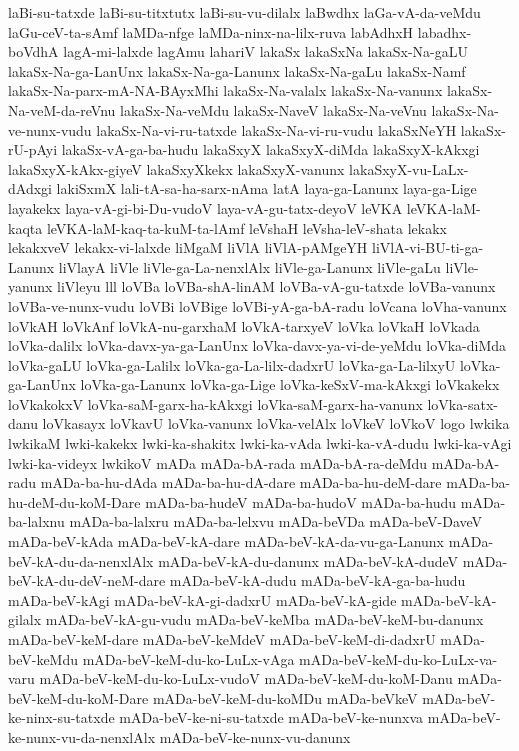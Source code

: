 {laBi-su-tatxde
laBi-su-titxtutx
laBi-su-vu-dilalx
laBwdhx
laGa-vA-da-veMdu
laGu-ceV-ta-sAmf
laMDa-nfge
laMDa-ninx-na-lilx-ruva
labAdhxH
labadhx-boVdhA
lagA-mi-lalxde
lagAmu
lahariV
lakaSx
lakaSxNa
lakaSx-Na-gaLU
lakaSx-Na-ga-LanUnx
lakaSx-Na-ga-Lanunx
lakaSx-Na-gaLu
lakaSx-Namf
lakaSx-Na-parx-mA-NA-BAyxMhi
lakaSx-Na-valalx
lakaSx-Na-vanunx
lakaSx-Na-veM-da-reVnu
lakaSx-Na-veMdu
lakaSx-NaveV
lakaSx-Na-veVnu
lakaSx-Na-ve-nunx-vudu
lakaSx-Na-vi-ru-tatxde
lakaSx-Na-vi-ru-vudu
lakaSxNeYH
lakaSx-rU-pAyi
lakaSx-vA-ga-ba-hudu
lakaSxyX
lakaSxyX-diMda
lakaSxyX-kAkxgi
lakaSxyX-kAkx-giyeV
lakaSxyXkekx
lakaSxyX-vanunx
lakaSxyX-vu-LaLx-dAdxgi
lakiSxmX
lali-tA-sa-ha-sarx-nAma
latA
laya-ga-Lanunx
laya-ga-Lige
layakekx
laya-vA-gi-bi-Du-vudoV
laya-vA-gu-tatx-deyoV
leVKA
leVKA-laM-kaqta
leVKA-laM-kaq-ta-kuM-ta-lAmf
leVshaH
leVsha-leV-shata
lekakx
lekakxveV
lekakx-vi-lalxde
liMgaM
liVlA
liVlA-pAMgeYH
liVlA-vi-BU-ti-ga-Lanunx
liVlayA
liVle
liVle-ga-La-nenxlAlx
liVle-ga-Lanunx
liVle-gaLu
liVle-yanunx
liVleyu
lll
loVBa
loVBa-shA-linAM
loVBa-vA-gu-tatxde
loVBa-vanunx
loVBa-ve-nunx-vudu
loVBi
loVBige
loVBi-yA-ga-bA-radu
loVcana
loVha-vanunx
loVkAH
loVkAnf
loVkA-nu-garxhaM
loVkA-tarxyeV
loVka
loVkaH
loVkada
loVka-dalilx
loVka-davx-ya-ga-LanUnx
loVka-davx-ya-vi-de-yeMdu
loVka-diMda
loVka-gaLU
loVka-ga-Lalilx
loVka-ga-La-lilx-dadxrU
loVka-ga-La-lilxyU
loVka-ga-LanUnx
loVka-ga-Lanunx
loVka-ga-Lige
loVka-keSxV-ma-kAkxgi
loVkakekx
loVkakokxV
loVka-saM-garx-ha-kAkxgi
loVka-saM-garx-ha-vanunx
loVka-satx-danu
loVkasayx
loVkavU
loVka-vanunx
loVka-velAlx
loVkeV
loVkoV
logo
lwkika
lwkikaM
lwki-kakekx
lwki-ka-shakitx
lwki-ka-vAda
lwki-ka-vA-dudu
lwki-ka-vAgi
lwki-ka-videyx
lwkikoV
mADa
mADa-bA-rada
mADa-bA-ra-deMdu
mADa-bA-radu
mADa-ba-hu-dAda
mADa-ba-hu-dA-dare
mADa-ba-hu-deM-dare
mADa-ba-hu-deM-du-koM-Dare
mADa-ba-hudeV
mADa-ba-hudoV
mADa-ba-hudu
mADa-ba-lalxnu
mADa-ba-lalxru
mADa-ba-lelxvu
mADa-beVDa
mADa-beV-DaveV
mADa-beV-kAda
mADa-beV-kA-dare
mADa-beV-kA-da-vu-ga-Lanunx
mADa-beV-kA-du-da-nenxlAlx
mADa-beV-kA-du-danunx
mADa-beV-kA-dudeV
mADa-beV-kA-du-deV-neM-dare
mADa-beV-kA-dudu
mADa-beV-kA-ga-ba-hudu
mADa-beV-kAgi
mADa-beV-kA-gi-dadxrU
mADa-beV-kA-gide
mADa-beV-kA-gilalx
mADa-beV-kA-gu-vudu
mADa-beV-keMba
mADa-beV-keM-bu-danunx
mADa-beV-keM-dare
mADa-beV-keMdeV
mADa-beV-keM-di-dadxrU
mADa-beV-keMdu
mADa-beV-keM-du-ko-LuLx-vAga
mADa-beV-keM-du-ko-LuLx-va-varu
mADa-beV-keM-du-ko-LuLx-vudoV
mADa-beV-keM-du-koM-Danu
mADa-beV-keM-du-koM-Dare
mADa-beV-keM-du-koMDu
mADa-beVkeV
mADa-beV-ke-ninx-su-tatxde
mADa-beV-ke-ni-su-tatxde
mADa-beV-ke-nunxva
mADa-beV-ke-nunx-vu-da-nenxlAlx
mADa-beV-ke-nunx-vu-danunx
}

